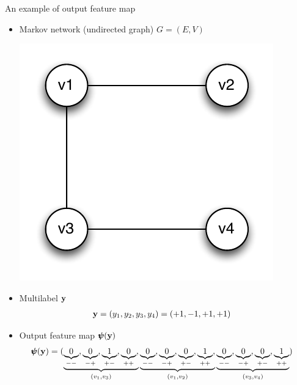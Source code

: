 \documentclass[first=dgreen,second=purple,logo=yellowexc]{aaltoslides}
\begin{document}
%
\begin{frame}{An example of output feature map}
	\begin{itemize}\footnotesize
		\item Markov network (undirected graph) $G=(E,V)$
		\begin{center}
			\includegraphics[scale=0.3]{./figures/outputgraph.pdf}
		\end{center}
		\item Multilabel $\mathbf {y}$
		\begin{align*}
			\mathbf {y}&=(y_1,y_2,y_3,y_4)=(+1,-1,+1,+1)
		\end{align*}
		\item Output feature map $\pmb \psi(\mathbf {y})$
		\begin{align*}
			\pmb \psi(\mathbf {y}) &= ( \underbrace{\underbrace{0}_{--}, \underbrace{0}_{-+}, \underbrace{1}_{+-}, \underbrace{0}_{++},}_{(v_1,v_3)} 
			\underbrace{\underbrace{0}_{--}, \underbrace{0}_{-+}, \underbrace{0}_{+-}, \underbrace{1}_{++},}_{(v_1,v_2)}
			\underbrace{\underbrace{0}_{--}, \underbrace{0}_{-+}, \underbrace{0}_{+-}, \underbrace{1}_{++}}_{(v_3,v_4)})
		\end{align*}
	\end{itemize}
\end{frame}
\end{document}
